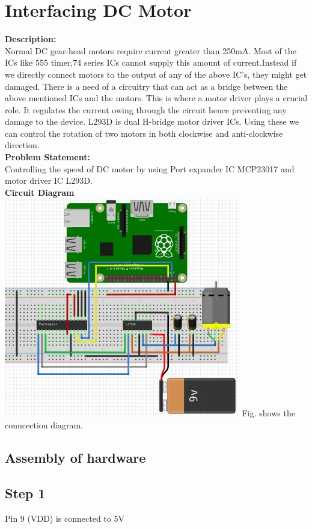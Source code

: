 \documentclass[a4paper,12pt,oneside]{book}
\begin{document}
\section{Interfacing DC Motor}
\textbf{Description:} \\
Normal DC gear-head motors require current greater than 250mA. Most of
the ICs like 555 timer,74 series ICs cannot supply this amount of
current.Instead if we directly connect motors to the output of any of the
above IC's, they might get damaged. There is a need of a circuitry that
can act as a bridge between the above mentioned ICs and the motors. This
is where a motor driver plays a crucial role. It regulates the current owing through the circuit hence preventing any damage to the device.
L293D is dual H-bridge motor driver ICs. Using these we can control the
rotation of two motors in both clockwise and anti-clockwise direction. \\
\textbf{Problem Statement:} \\
Controlling the speed of DC motor by using Port expander IC MCP23017 and motor
driver IC L293D. \\
\textbf{Circuit Diagram}\\
\centering
\includegraphics[scale=0.6]{dc_motor_I2C}
\flushleft
Fig. shows the conncection diagram.
\subsection*{Assembly of hardware}
\subsection*{Step 1}
Pin 9 (VDD) is connected to 5V
\end{document}
